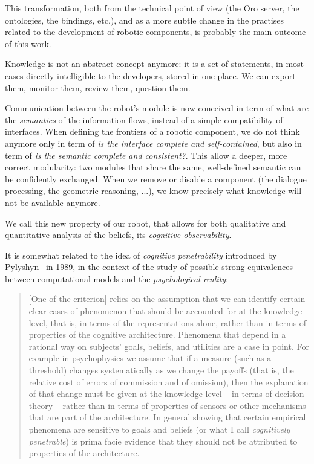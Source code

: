 \documentclass[letterpaper, 10 pt, conference]{ieeeconf}  %
\begin{document}
This transformation, both from the technical point of view (the {\sc Oro}
server, the ontologies, the bindings, etc.), and as a more subtle change in the
practises related to the development of robotic components, is probably the
main outcome of this work.

Knowledge is not an abstract concept anymore: it is a set of statements, in
most cases directly intelligible to the developers, stored in one place. We can
export them, monitor them, review them, question them.

Communication between the robot's module is now conceived in term of what are
the \emph{semantics} of the information flows, instead of a simple
compatibility of interfaces. When defining the frontiers of a robotic
component, we do not think anymore only in term of \emph{is the interface complete
and self-contained}, but also in term of \emph{is the semantic complete and
consistent?}. This allow a deeper, more correct modularity: two modules that
share the same, well-defined semantic can be confidently exchanged. When we
remove or disable a component (the dialogue processing, the geometric
reasoning, ...), we know precisely what knowledge will not be available
anymore.

We call this new property of our robot, that allows for both qualitative and
quantitative analysis of the beliefs, its \emph{cognitive observability}.

It is somewhat related to the idea of \emph{cognitive penetrability} introduced
by Pylyshyn~\cite{Pylyshyn1989} in 1989, in the context of the study of
possible strong equivalences between computational models and the
\emph{psychological reality}:

\begin{quote}

    [One of the criterion] relies on the assumption that we can identify
    certain clear cases of phenomenon that should be accounted for at the
    knowledge level, that is, in terms of the representations alone, rather
    than in terms of properties of the cognitive architecture. Phenomena that
    depend in a rational way on subjects' goals, beliefs, and utilities are a
    case in point. For example in psychophysics we assume that if a measure
    (such as a threshold) changes systematically as we change the payoffs (that
    is, the relative cost of errors of commission and of omission), then the
    explanation of that change must be given at the knowledge level -- in terms
    of decision theory -- rather than in terms of properties of sensors or
    other mechanisms that are part of the architecture. In general showing that
    certain empirical phenomena are sensitive to goals and beliefs (or what I
    call \emph{cognitively penetrable}) is prima facie evidence that they
    should not be attributed to properties of the architecture.

\end{quote}
\end{document}
